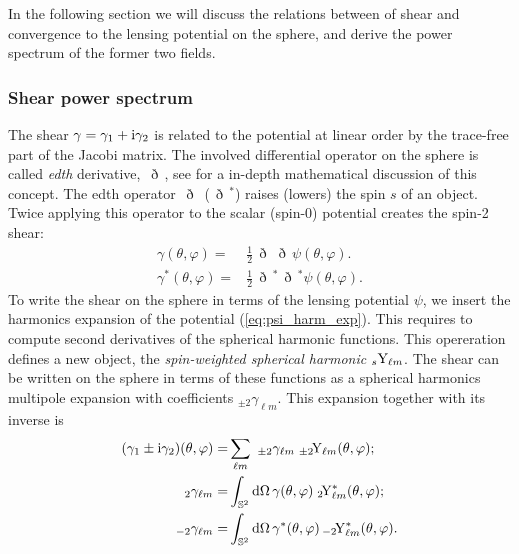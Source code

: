 \documentclass[fleqn,usenatbib]{mnras} %
\newcommand{\edth}{\,\eth\,}
\begin{document}
In the following section we will discuss the relations between of shear and
convergence to the lensing potential on the sphere, and derive the power
spectrum of the former two fields.

\subsubsection{Shear power spectrum}

The shear $\gamma = \gamma_1 + {\rm i} \gamma_2$ is related to the potential at
linear order by the trace-free part of the Jacobi matrix. The involved
differential operator on the sphere is called \emph{edth} derivative, $\edth$,
see \cite{2005PhRvD..72b3516C} for a in-depth mathematical discussion of this
concept. The edth operator $\edth$ ($\edth^\ast$) raises (lowers) the spin $s$
of an object. Twice applying this operator to the scalar (spin-0) potential
creates the spin-2 shear:
%
\begin{align}
  \gamma(\theta, \varphi) = & \frac 1 2 \edth \edth \psi(\theta, \varphi).
    \nonumber \\
  \gamma^\ast(\theta, \varphi) = & \frac 1 2 \edth^\ast \edth^\ast \psi(\theta, \varphi).
  \label{gamma_psi_spher}
\end{align}
%
To write the shear on the sphere in terms of the lensing potential $\psi$, we
insert the harmonics expansion of the potential (\ref{eq:psi_harm_exp}). This
requires to compute second derivatives of the spherical harmonic functions.
This opereration defines a new object, the \emph{spin-weighted spherical
harmonic} $_s{\rm Y}_{\ell m}$. The shear can be written on the sphere in terms
of these functions as a spherical harmonics multipole expansion with
coefficients $_{\pm 2} \gamma_{\ell m}$. This expansion together with its inverse
is
%
%
\begin{align}
  (\gamma_1 \pm {\rm i} \gamma_2)(\theta, \varphi) = & \sum_{\ell m} \,\, _{\pm 2}\gamma_{\ell m} \; _{\pm 2}\!{\rm Y}_{\ell m}(\theta, \varphi);
  \label{eq:gamma_harm_exp}
    \\
  \, _2 \gamma_{\ell m} = & \int_{\mathbb{S}^2} {\rm d} \Omega \, \gamma(\theta, \varphi) \;  _2\!{\rm Y}^\ast_{\ell m}(\theta, \varphi);
    \nonumber \\
  \, _{-2} \gamma_{\ell m} = & \int_{\mathbb{S}^2} {\rm d} \Omega \, \gamma^\ast(\theta, \varphi) \,  _{-2}\!{\rm Y}^\ast_{\ell m}(\theta, \varphi).
  \label{eq:gamma_harm_exp_inv}
\end{align}
\end{document}
